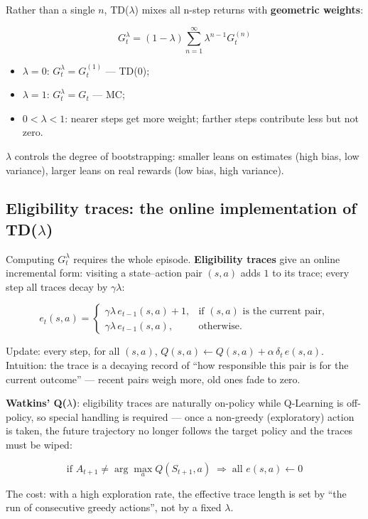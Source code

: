 \documentclass{article}
\begin{document}
Rather than a single $n$, TD($\lambda$) mixes all n-step returns with \textbf{geometric weights}:

\[
\boxed{G_t^\lambda = (1-\lambda)\sum_{n=1}^{\infty} \lambda^{n-1} G_t^{(n)}}
\]

\begin{itemize}
  \item $\lambda=0$: $G_t^\lambda = G_t^{(1)}$ --- TD(0);
  \item $\lambda=1$: $G_t^\lambda = G_t$ --- MC;
  \item $0<\lambda<1$: nearer steps get more weight; farther steps contribute less but not zero.
\end{itemize}

$\lambda$ controls the degree of bootstrapping: smaller leans on estimates (high bias, low variance), larger leans on real rewards (low bias, high variance).

\subsection*{Eligibility traces: the online implementation of TD($\lambda$)}

Computing $G_t^\lambda$ requires the whole episode. \textbf{Eligibility traces} give an online incremental form: visiting a state--action pair $(s,a)$ adds $1$ to its trace; every step all traces decay by $\gamma\lambda$:

\[
e_t(s,a) = \begin{cases}
  \gamma\lambda\, e_{t-1}(s,a) + 1, & \text{if } (s,a) \text{ is the current pair}, \\
  \gamma\lambda\, e_{t-1}(s,a),      & \text{otherwise}.
\end{cases}
\]

Update: every step, for all $(s,a)$, $Q(s,a) \leftarrow Q(s,a) + \alpha\,\delta_t\, e(s,a)$. Intuition: the trace is a decaying record of ``how responsible this pair is for the current outcome'' --- recent pairs weigh more, old ones fade to zero.

\textbf{Watkins' Q($\lambda$)}: eligibility traces are naturally on-policy while Q-Learning is off-policy, so special handling is required --- once a non-greedy (exploratory) action is taken, the future trajectory no longer follows the target policy and the traces must be wiped:

\[
\text{if } A_{t+1} \neq \arg\max_a Q(S_{t+1},a) \;\Longrightarrow\; \text{all } e(s,a) \leftarrow 0
\]

The cost: with a high exploration rate, the effective trace length is set by ``the run of consecutive greedy actions'', not by a fixed $\lambda$.
\end{document}
